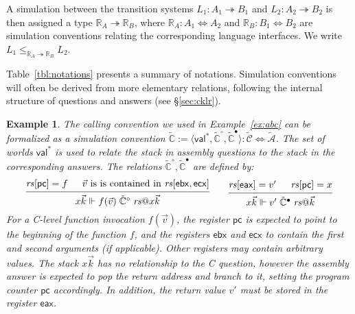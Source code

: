 \documentclass[11pt,oneside]{book}
\newtheorem{example}[theorem]{Example}
\theoremstyle{definition}
\newcommand{\kw}[1]{\ensuremath{ \mathsf{#1} }}
\newcommand{\que}{\circ}         %
\newcommand{\ans}{\bullet}       %
\begin{document}
A simulation between the transition systems
$L_1 : A_1 \twoheadrightarrow B_1$ and
$L_2 : A_2 \twoheadrightarrow B_2$
is then assigned a type $\mathbb{R}_A \twoheadrightarrow \mathbb{R}_B$,
where %
$\mathbb{R}_A : A_1 \Leftrightarrow A_2$ and
$\mathbb{R}_B : B_1 \Leftrightarrow B_2$
are simulation conventions
relating the corresponding language interfaces.
We write
$L_1 \le_{\mathbb{R}_A \twoheadrightarrow \mathbb{R}_B} L_2$.

Table~\ref{tbl:notations} presents a summary of notations.
Simulation conventions
will often be derived from
more elementary relations,
following the internal structure of questions and answers
(see \S\ref{sec:cklr}).

\begin{example} %
The calling convention we used in Example~\ref{ex:abc}
can be formalized as a simulation convention
$\tilde{\mathbb{C}} :=
  \langle \kw{val}^*, \tilde{\mathbb{C}}^\que, \tilde{\mathbb{C}}^\ans \rangle :
    \tilde{\mathcal{C}} \Leftrightarrow \tilde{\mathcal{A}}$.
The set of worlds $\kw{val}^*$ is used
to relate the stack in
assembly questions to the stack in the corresponding answers.
The relations $\tilde{\mathbb{C}}^\que, \tilde{\mathbb{C}}^\ans$
are defined by:
\[
  \begin{prooftree}
    \hypo{\mathit{rs}[\kw{pc}] = f}
    \hypo{\vec{v} \text{ is is contained in } \mathit{rs}[\kw{ebx}, \kw{ecx}]}
    \infer2{
      x \vec{k} \Vdash
      f(\vec{v}) \mathrel{\tilde{\mathbb{C}}^\que} \mathit{rs}@ x \vec{k}
    }
  \end{prooftree}
  \qquad
  \begin{prooftree}
    \hypo{\mathit{rs}[\kw{eax}] = v'}
    \hypo{\mathit{rs}[\kw{pc}] = x}
    \infer2{
      x \vec{k} \Vdash
      v' \mathrel{\tilde{\mathbb{C}}^\ans} \mathit{rs}@\vec{k}
    }
  \end{prooftree}
\]
For a C-level function invocation $f(\vec{v})$,
the register $\kw{pc}$ is expected to point to
the beginning of the function $f$,
and the registers $\kw{ebx}$ and $\kw{ecx}$
to contain the first and second arguments (if applicable).
Other registers may contain arbitrary values.
The stack $x \vec{k}$ has no relationship to the C question,
however the assembly answer is expected to pop the return address
and branch to it, setting the program counter $\kw{pc}$ accordingly.
In addition,
the return value $v'$ must be stored
in the register $\kw{eax}$.
\end{example}
\end{document}
